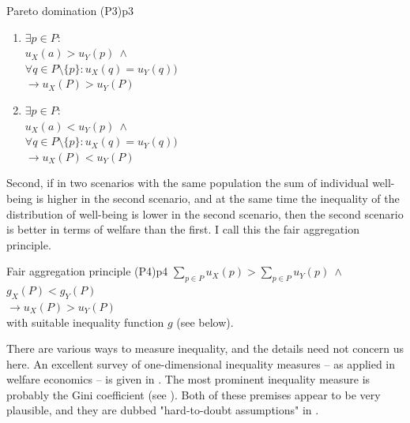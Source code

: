\begin{Premise}{Pareto domination (P3)}{p3}
  \begin{enumerate}
  \item
    $
      \exists p \in P:
    $ \\
    \hspace*{1cm} $
      u_X(a) > u_Y(p) \ \wedge
    $ \\
    \hspace*{1cm} $
      \forall q \in P \setminus \{p\}: u_X(q) = u_Y(q) )
    $ \\
    \hspace*{.5cm} $
      \rightarrow
      u_X(P) > u_Y(P) 
    $
  \item
    $
      \exists p \in P:
    $ \\
    \hspace*{1cm} $
      u_X(a) < u_Y(p) \ \wedge
    $ \\
    \hspace*{1cm} $
      \forall q \in P \setminus \{p\}: u_X(q) = u_Y(q) )
    $ \\
    \hspace*{.5cm} $
      \rightarrow
      u_X(P) < u_Y(P) 
    $
  \end{enumerate}
\end{Premise}

Second, if in two scenarios with the same population the sum of individual well-being is higher in the second scenario, and at the same time the inequality of the distribution of well-being is lower in the second scenario, then the second scenario is better in terms of welfare than the first. I call this the fair aggregation principle. 

\begin{Premise}{Fair aggregation principle (P4)}{p4}
  \hspace*{.5cm} $
    \sum_{p\in P} u_X(p) > \sum_{p\in P} u_Y(p) \ \wedge
  $ \\
  \hspace*{.5cm} $g_X(P) < g_Y(P)
  $ \\
  $
    \rightarrow u_X(P) > u_Y(P)
  $ \\
  with suitable inequality function $g$ (see below).
\end{Premise}

There are various ways to measure inequality, and the details need not concern us here. An excellent survey of one-dimensional inequality measures – as applied in welfare economics – is given in . The most prominent inequality measure is probably the Gini coefficient (see ). Both of these premises appear to be very plausible, and they are dubbed "hard-to-doubt assumptions" in . 

